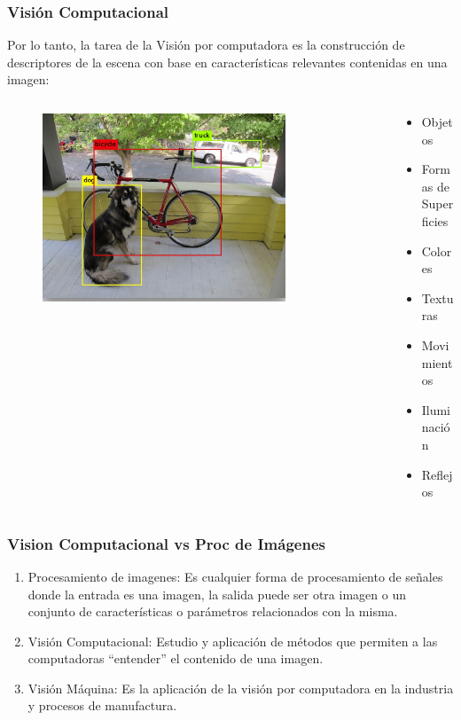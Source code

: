 \begin{frame}\frametitle{Visión Computacional}
  Por lo tanto, la tarea de la Visión por computadora es la construcción de descriptores de la escena con base en características relevantes contenidas en una imagen:
  \begin{columns}
    \begin{column}{0.5\textwidth}
\begin{figure}
    \centering
    \includegraphics[width=0.8\textwidth]{Figures/YoloExample.png}
\end{figure}
    \end{column}
    \begin{column}{0.5\textwidth}
\begin{itemize}
\item Objetos
\item Formas de Superficies
\item Colores
\item Texturas
\item Movimientos
\item Iluminación
\item Reflejos
\end{itemize}
    \end{column}
    \end{columns}
\end{frame}

\begin{frame}\frametitle{Vision Computacional vs Proc de Imágenes}
\begin{enumerate}
\item Procesamiento de imagenes: Es cualquier forma de procesamiento de señales donde la entrada es una imagen, la salida puede ser otra imagen o un conjunto de características o parámetros relacionados con la misma.
\item Visión Computacional: Estudio y aplicación de métodos que permiten a las computadoras “entender” el contenido de una imagen.
\item Visión Máquina: Es la aplicación de la visión por computadora en la industria y procesos de manufactura.
\end{enumerate}

\end{frame}


